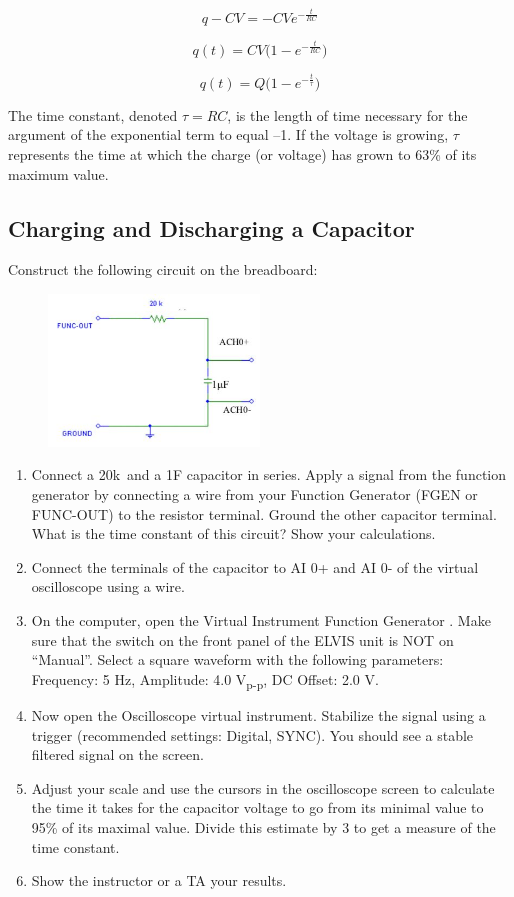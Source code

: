 \documentclass{article}
\begin{document}
$$q-CV = -CVe^{-\frac{t}{RC}}$$

$$q(t) = CV\Big(1-e^{-\frac{t}{RC}}\Big)$$

$$q(t) = Q\Big(1-e^{-\frac{t}{\tau}}\Big)$$

The time constant, denoted $\tau = RC$, is the length of time necessary for the argument of the exponential term to equal –1. If the voltage is growing, $\tau$ represents the time at which the charge (or voltage) has grown to 63\% of its maximum value.

\subsection*{Charging and Discharging a Capacitor}
Construct the following circuit on the breadboard:

\begin{figure}[h]
    	\includegraphics[width=0.5\textwidth]{lab_1_fig_2.jpg}
    	\centering
		\end{figure}

\begin{enumerate}
	\item Connect a 20k\textOmega\ and a 1\textmu F capacitor in series. Apply a signal from the function generator by connecting a wire from your Function Generator (FGEN or FUNC-OUT) to the resistor terminal. Ground the other capacitor terminal. What is the time constant of this circuit? Show your calculations.
	\item Connect the terminals of the capacitor to AI 0+ and AI 0- of the virtual oscilloscope using a wire.
	\item On the computer, open the Virtual Instrument Function Generator . Make sure that the switch on the front panel of the ELVIS unit is NOT on “Manual”. Select a square waveform with the following parameters: Frequency: 5 Hz, Amplitude: 4.0 V\textsubscript{p-p}, DC Offset: 2.0 V.
	\item Now open the Oscilloscope virtual instrument. Stabilize the signal using a trigger (recommended settings: Digital, SYNC). You should see a stable filtered signal on the screen.
	\item Adjust your scale and use the cursors in the oscilloscope screen to calculate the time it takes for the capacitor voltage to go from its minimal value to 95\% of its maximal value. Divide this estimate by 3 to get a measure of the time constant.
	\item Show the instructor or a TA your results.
\end{enumerate}
\end{document}
